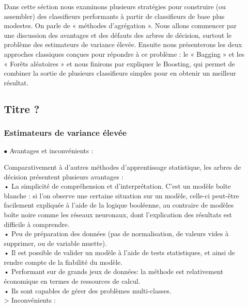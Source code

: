 \documentclass[11pt]{article}
\begin{document}
Dans cette séction nous examinons plusieurs stratégies pour construire (ou assembler) des classifieurs performants à partir de classifieurs de base plus modestes. On parle de « méthodes d’agrégation ». 
Nous allons commencer par une discussion des avantages et des défauts des arbres de décision, surtout le problème des estimateurs de variance élevée. Ensuite nous présenterons les deux approches classiques conçues pour répondre à ce problème : le « Bagging » et les « Forêts aléatoires » et nous finirons par expliquer le Boosting, qui permet de combiner la sortie de plusieurs classifieurs simples pour en obtenir un meilleur résultat.


\subsection{Titre ?}

\subsubsection{Estimateurs de variance élevée}

$\bullet$ Avantages et inconvénients : 

Comparativement à d'autres méthodes d’apprentissage statistique, les arbres de décision présentent plusieurs avantages :\\
•	La simplicité de compréhension et d'interprétation. 
C'est un modèle boîte blanche : si l'on observe une certaine situation sur un modèle, celle-ci peut-être facilement expliquée à l'aide de la logique booléenne, au contraire de modèles boîte noire comme les réseaux neuronaux, dont l'explication des résultats est difficile à comprendre.\\
•	Peu de préparation des données (pas de normalisation, de valeurs vides à supprimer, ou de variable muette).\\
•	Il est possible de valider un modèle à l'aide de tests statistiques, et ainsi de rendre compte de la fiabilité du modèle.\\
•	Performant sur de grands jeux de données: la méthode est relativement économique en termes de ressources de calcul.\\
•	Ils sont capables de gérer des problèmes multi-classes.\\

> Inconvénients : 
\end{document}
